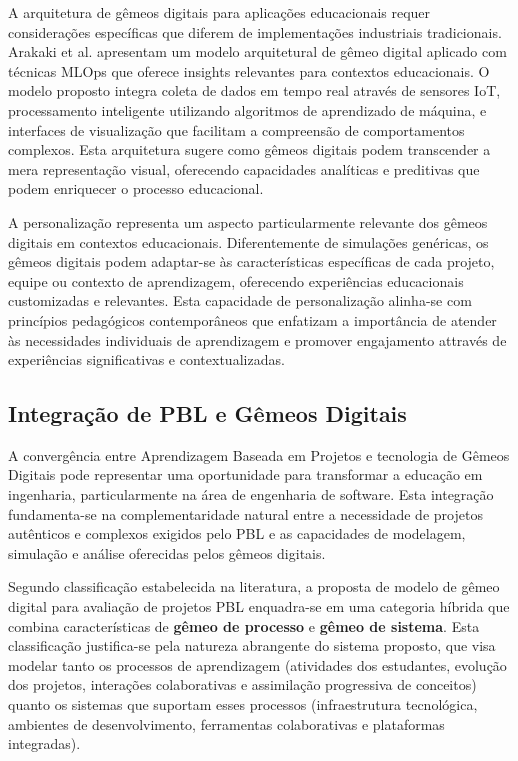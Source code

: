 \documentclass[12pt,a4paper]{article}
\begin{document}
A arquitetura de gêmeos digitais para aplicações educacionais requer
considerações específicas que diferem de implementações industriais
tradicionais. Arakaki et al. \cite{arakaki2022} apresentam um modelo
arquitetural de gêmeo digital aplicado com técnicas MLOps que oferece insights
relevantes para contextos educacionais. O modelo proposto integra coleta de
dados em tempo real através de sensores IoT, processamento inteligente
utilizando algoritmos de aprendizado de máquina, e interfaces de visualização
que facilitam a compreensão de comportamentos complexos. Esta arquitetura
sugere como gêmeos digitais podem transcender a mera representação visual,
oferecendo capacidades analíticas e preditivas que podem enriquecer o processo
educacional.

A personalização representa um aspecto particularmente relevante dos gêmeos
digitais em contextos educacionais. Diferentemente de simulações genéricas, os
gêmeos digitais podem adaptar-se às características específicas de cada
projeto, equipe ou contexto de aprendizagem, oferecendo experiências
educacionais customizadas e relevantes. Esta capacidade de personalização
alinha-se com princípios pedagógicos contemporâneos que enfatizam a importância
de atender às necessidades individuais de aprendizagem e promover engajamento
attravés de experiências significativas e contextualizadas.

\subsection{Integração de PBL e Gêmeos Digitais}

A convergência entre Aprendizagem Baseada em Projetos e tecnologia de Gêmeos
Digitais pode representar uma oportunidade para transformar a educação em
ingenharia, particularmente na área de engenharia de software. Esta integração
fundamenta-se na complementaridade natural entre a necessidade de projetos
autênticos e complexos exigidos pelo PBL e as capacidades de modelagem,
simulação e análise oferecidas pelos gêmeos digitais.

Segundo classificação estabelecida na literatura, a proposta de
modelo de gêmeo digital para avaliação de projetos PBL enquadra-se em uma
categoria híbrida que combina características de \textbf{gêmeo de processo} e
\textbf{gêmeo de sistema}. Esta classificação justifica-se pela natureza
abrangente do sistema proposto, que visa modelar tanto os processos de
aprendizagem (atividades dos estudantes, evolução dos projetos, interações
colaborativas e assimilação progressiva de conceitos) quanto os sistemas que
suportam esses processos (infraestrutura tecnológica, ambientes de
desenvolvimento, ferramentas colaborativas e plataformas integradas).
\end{document}
